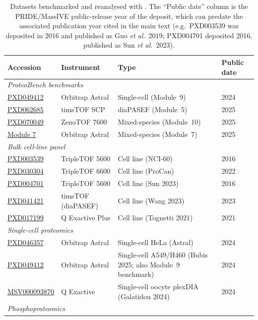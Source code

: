 \documentclass[preprint,12pt]{elsarticle}
\newcommand{\sdrf}[1]{\href{https://github.com/bigbio/sdrf-annotated-datasets/blob/main/datasets/#1/#1.sdrf.tsv}{#1}}
\begin{document}
\begin{table}[htbp]
\centering
\small
\caption{Datasets benchmarked and reanalysed with \quantmsdiann{}. The
``Public date'' column is the PRIDE/MassIVE public-release year of the
deposit, which can predate the associated publication year cited in the main
text (e.g.\ PXD003539 was deposited in 2016 and published as Guo \textit{et al.}~2019;
PXD004701 deposited 2016, published as Sun \textit{et al.}~2023).}
\label{tab:datasets-supp}
{\setlength{\tabcolsep}{4pt}
\begin{tabular}{ll>{\raggedright\arraybackslash}p{}l}
\hline
\textbf{Accession} & \textbf{Instrument} & \textbf{Type} & \textbf{Public date} \\
\hline
\multicolumn{4}{l}{\textit{ProteoBench benchmarks}} \\
\sdrf{PXD049412} & Orbitrap Astral & Single-cell (Module~9) & 2024 \\
\sdrf{PXD062685} & timsTOF SCP & diaPASEF (Module~5) & 2025 \\
\sdrf{PXD070049} & ZenoTOF 7600 & Mixed-species (Module~10) & 2025 \\
\href{https://github.com/bigbio/sdrf-annotated-datasets/blob/main/datasets/ProteoBench-Astral-Module7/ProteoBench-Astral-Module7.sdrf.tsv}{Module 7} & Orbitrap Astral & Mixed-species (Module~7) & 2025 \\
\hline
\multicolumn{4}{l}{\textit{Bulk cell-line panel}} \\
\sdrf{PXD003539} & TripleTOF 5600 & Cell line (NCI-60) & 2016 \\
\sdrf{PXD030304} & TripleTOF 6600 & Cell line (ProCan) & 2022 \\
\sdrf{PXD004701} & TripleTOF 5600 & Cell line (Sun 2023) & 2016 \\
\sdrf{PXD041421} & timsTOF (diaPASEF) & Cell line (Wang 2023) & 2023 \\
\sdrf{PXD017199} & Q Exactive Plus & Cell line (Tognetti 2021) & 2021 \\
\hline
\multicolumn{4}{l}{\textit{Single-cell proteomics}} \\
\sdrf{PXD046357} & Orbitrap Astral & Single-cell HeLa (Astral) & 2024 \\
\sdrf{PXD049412} & Orbitrap Astral & Single-cell A549/H460 (Bubis 2025; also Module~9 benchmark) & 2024 \\
\sdrf{MSV000093870} & Q Exactive & Single-cell oocyte plexDIA (Galatidou 2024) & 2024 \\
\hline
\multicolumn{4}{l}{\textit{Phosphoproteomics}} \\

\end{tabular}}
\end{table}
\end{document}
